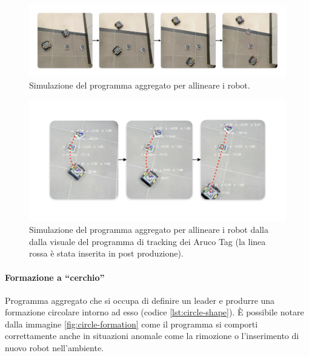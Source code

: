 \documentclass[12pt,a4paper,openright,twoside]{book}
\begin{document}
% 

\begin{figure}
    \centering
    \includegraphics[width=.99\linewidth]{figures/line2.pdf}
    \caption{Simulazione del programma aggregato per allineare i robot.}
    \label{fig:line-shape-2}
\end{figure}

\begin{figure}
    \centering
    \includegraphics[width=.99\linewidth]{figures/line1.pdf}
    \caption{Simulazione del programma aggregato per allineare i robot dalla dalla visuale del programma di tracking dei Aruco Tag (la linea rossa è  stata inserita in post produzione).}
    \label{fig:line-shape-1}
\end{figure}

\paragraph{Formazione a ``cerchio''}

Programma aggregato che si occupa di definire un leader e produrre una formazione circolare intorno ad esso (codice \ref{lst:circle-shape}). È possibile notare dalla immagine \ref{fig:circle-formation} come il programma si comporti correttamente anche in situazioni anomale come la rimozione o l'inserimento di nuovo robot nell'ambiente.


\end{document}
